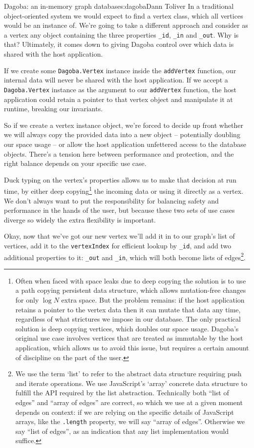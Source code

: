 \begin{aosachapter}{Dagoba: an in-memory graph database}{s:dagoba}{Dann Toliver}
In a traditional object-oriented system we would expect to find a vertex
class, which all vertices would be an instance of. We're going to take a
different approach and consider as a vertex any object containing the
three properties \texttt{\_id}, \texttt{\_in} and \texttt{\_out}. Why is
that? Ultimately, it comes down to giving Dagoba control over which data
is shared with the host application.

If we create some \texttt{Dagoba.Vertex} instance inside the
\texttt{addVertex} function, our internal data will never be shared with
the host application. If we accept a \texttt{Dagoba.Vertex} instance as
the argument to our \texttt{addVertex} function, the host application
could retain a pointer to that vertex object and manipulate it at
runtime, breaking our invariants.

So if we create a vertex instance object, we're forced to decide up
front whether we will always copy the provided data into a new object --
potentially doubling our space usage -- or allow the host application
unfettered access to the database objects. There's a tension here
between performance and protection, and the right balance depends on
your specific use case.

Duck typing on the vertex's properties allows us to make that decision
at run time, by either deep copying\footnote{Often when faced with space
  leaks due to deep copying the solution is to use a path copying
  persistent data structure, which allows mutation-free changes for only
  $\log{}N$ extra space. But the problem remains: if the host
  application retains a pointer to the vertex data then it can mutate
  that data any time, regardless of what strictures we impose in our
  database. The only practical solution is deep copying vertices, which
  doubles our space usage. Dagoba's original use case involves vertices
  that are treated as immutable by the host application, which allows us
  to avoid this issue, but requires a certain amount of discipline on
  the part of the user.} the incoming data or using it directly as a
vertex. We don't always want to put the responsibility for balancing
safety and performance in the hands of the user, but because these two
sets of use cases diverge so widely the extra flexibility is important.

Okay, now that we've got our new vertex we'll add it in to our graph's
list of vertices, add it to the \texttt{vertexIndex} for efficient
lookup by \texttt{\_id}, and add two additional properties to it:
\texttt{\_out} and \texttt{\_in}, which will both become lists of
edges\footnote{We use the term `list' to refer to the abstract data
  structure requiring push and iterate operations. We use JavaScript's
  `array' concrete data structure to fulfill the API required by the
  list abstraction. Technically both ``list of edges'' and ``array of
  edges'' are correct, so which we use at a given moment depends on
  context: if we are relying on the specific details of JavaScript
  arrays, like the \texttt{.length} property, we will say ``array of
  edges''. Otherwise we say ``list of edges'', as an indication that any
  list implementation would suffice.}.


\end{aosachapter}
